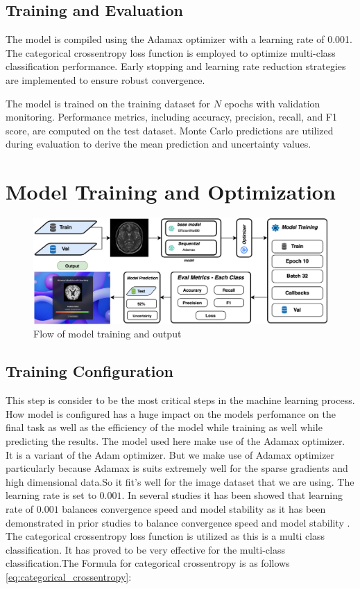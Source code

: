 \documentclass[12pt,onecolumn]{report}
\begin{document}
\subsection{Training and Evaluation}
The model is compiled using the Adamax optimizer with a learning rate of 0.001. The categorical crossentropy loss function is employed to optimize multi-class classification performance. Early stopping and learning rate reduction strategies are implemented to ensure robust convergence.

The model is trained on the training dataset for $N$ epochs with validation monitoring. Performance metrics, including accuracy, precision, recall, and F1 score, are computed on the test dataset. Monte Carlo predictions are utilized during evaluation to derive the mean prediction and uncertainty values.


\section{Model Training and Optimization}
\begin{figure}[h!]
    \centering
    \includegraphics[width=1.0\columnwidth]{figures/model_training_optimization.png}  %
    \caption{Flow of model training and output} %
    \label{fig:model training} %
\end{figure}



\subsection{Training Configuration}
This step is consider to be the most critical steps in the machine learning process. How model is configured has a huge impact on the models perfomance on the final task as well as the efficiency of the model while training as well while predicting the results. The model used here make use of the Adamax optimizer. It is a variant of the Adam optimizer. But we make use of Adamax optimizer particularly because Adamax is suits extremely well for the sparse gradients and high dimensional data.So it fit's well for the image dataset that we are using. The learning rate is set to \(0.001\). In several studies it has been showed that learning rate of \(0.001\) balances convergence speed and model stability as it has been demonstrated in prior studies to balance convergence speed and model stability \cite{2017Kingma}. The categorical crossentropy loss function is utilized as this is a multi class classification. It has proved to be very effective for the multi-class classification.The Formula for categorical crossentropy is as follows \ref{eq:categorical_crossentropy}:
\end{document}
